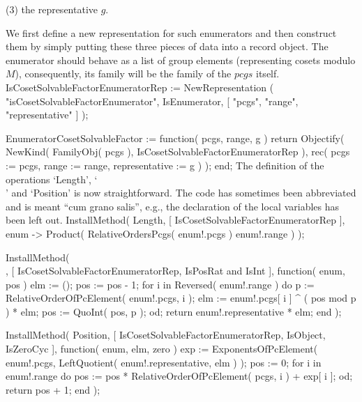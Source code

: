 \item{(3)} the representative $g$.

\endlist

We   first  define a  new representation  for   such enumerators and then
construct them by simply putting these three pieces of data into a record
object. The  enumerator  should  behave as  a   list of  group   elements
(representing cosets modulo $M$),   consequently, its family will  be the
family of the $pcgs$ itself.
\begintt
IsCosetSolvableFactorEnumeratorRep := NewRepresentation
    ( "isCosetSolvableFactorEnumerator", IsEnumerator,
                                [ "pcgs", "range", "representative" ] );

EnumeratorCosetSolvableFactor := function( pcgs, range, g )
    return Objectify( NewKind( FamilyObj( pcgs ),
                   IsCosetSolvableFactorEnumeratorRep ),
                   rec( pcgs := pcgs,
                       range := range,
              representative := g ) );
end;
\endtt
The definition of the operations `Length', `\\[\\]' and `Position' is now
straightforward. The  code has sometimes  been  abbreviated and is  meant
``cum grano salis'',  e.g.,  the declaration of  the local  variables has
been left out.
\begintt
InstallMethod( Length, [ IsCosetSolvableFactorEnumeratorRep ],
    enum -> Product( RelativeOrdersPcgs( enum!.pcgs ){ enum!.range } ) );
\endtt

\begintt
InstallMethod( \[\], [ IsCosetSolvableFactorEnumeratorRep,
        IsPosRat and IsInt ],
    function( enum, pos )
    elm := ();
    pos := pos - 1;
    for i  in Reversed( enum!.range )  do
        p := RelativeOrderOfPcElement( enum!.pcgs, i );
        elm := enum!.pcgs[ i ] ^ ( pos mod p ) * elm;
        pos := QuoInt( pos, p );
    od;
    return enum!.representative * elm;
end );
\endtt

\begintt
InstallMethod( Position, [ IsCosetSolvableFactorEnumeratorRep,
        IsObject, IsZeroCyc ],
    function( enum, elm, zero )
    exp := ExponentsOfPcElement( enum!.pcgs,
                   LeftQuotient( enum!.representative, elm ) );
    pos := 0;
    for i  in enum!.range  do
        pos := pos * RelativeOrderOfPcElement( pcgs, i ) + exp[ i ];
    od;
    return pos + 1;
end );
\endtt


